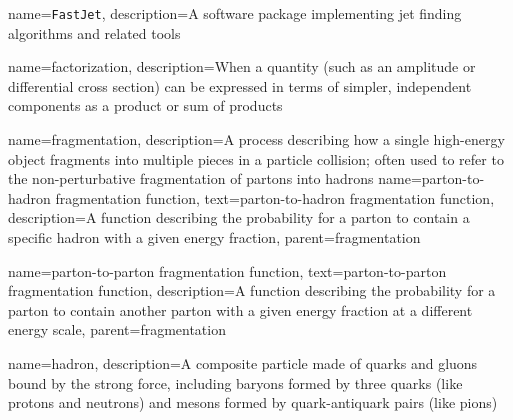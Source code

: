 {
    name=\texttt{FastJet},
    description={A software package implementing jet finding algorithms and related tools}
}


{
  name=factorization,
  description={When a quantity (such as an amplitude or differential cross section) can be expressed in terms of simpler, independent components as a product or sum of products}
}







{
  name=fragmentation,
  description={A process describing how a single high-energy object fragments into multiple pieces in a particle collision;
  often used to refer to the non-perturbative fragmentation of partons into hadrons}
}
    {
      name=parton-to-hadron fragmentation function,
      text=parton-to-hadron fragmentation function,
      description={A function describing the probability for a parton to contain a specific hadron with a given energy fraction},
      parent=fragmentation
    }

    {
      name=parton-to-parton fragmentation function,
      text=parton-to-parton fragmentation function,
      description={A function describing the probability for a parton to contain another parton with a given energy fraction at a different energy scale},
      parent=fragmentation
    }






{
  name=hadron,
  description={A composite particle made of quarks and gluons bound by the strong force, including baryons formed by three quarks (like protons and neutrons) and mesons formed by quark-antiquark pairs (like pions)}
}

